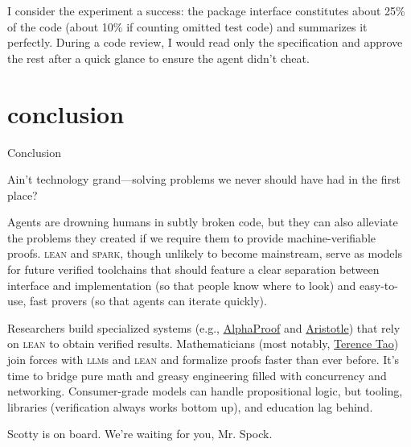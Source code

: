 \documentclass{article}
\begin{document}
I consider the experiment a success: the package interface constitutes about 25\% of the code
(about 10\% if counting omitted test code) and summarizes it perfectly.
During a code review,
I would read only the specification and approve the rest after a quick glance to ensure the agent didn't cheat.


\section{conclusion}{Conclusion}

\epigraph{
  Ain't technology grand---solving problems we never should have had in the first place?
}{}

Agents are drowning humans in subtly broken code,
but they can also alleviate the problems they created if we require them to provide machine-verifiable proofs.
\textsc{lean} and \textsc{spark}, though unlikely to become mainstream,
serve as models for future verified toolchains
that should feature a clear separation between interface and implementation (so that people know where to look)
and easy-to-use, fast provers (so that agents can iterate quickly).

Researchers build specialized systems (e.g.,
\href{https://www.julian.ac/blog/2025/11/13/alphaproof-paper/}{AlphaProof}
and \href{https://aristotle.harmonic.fun/}{Aristotle})
that rely on \textsc{lean} to obtain verified results.
Mathematicians (most notably, \href{https://youtu.be/cyyR7j2ChCI?si=NslhiTzusR4E10K_}{Terence Tao})
join forces with \textsc{llm}s and \textsc{lean} and formalize proofs faster than ever before.
It's time to bridge pure math and greasy engineering filled with concurrency and networking.
Consumer-grade models can handle propositional logic,
but tooling, libraries (verification always works bottom up), and education lag behind.

Scotty is on board. We're waiting for you, Mr. Spock.
\end{document}

